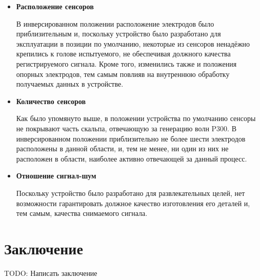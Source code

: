 \documentclass[12pt,fleqn]{article}
\begin{document}
	\begin{itemize}
	\item
	\par {\bf Расположение сенсоров}
	\par В инверсированном положении расположение электродов было приблизительным и, поскольку устройство было разработано для эксплуатации в позиции по умолчанию, некоторые из сенсоров ненадёжно крепились к голове испытуемого, не обеспечивая должного качества регистрируемого сигнала. Кроме того, изменились также и положения опорных электродов, тем самым повлияв на внутреннюю обработку получаемых данных в устройстве.
	\item
	\par {\bf Количество сенсоров}
	\par Как было упомянуто выше, в положении устройства по умолчанию сенсоры не покрывают часть скальпа, отвечающую за генерацию волн P300. В инверсированном положении приблизительно не более шести электродов расположены в данной области, и, тем не менее, ни один из них не расположен в области, наиболее активно отвечающей за данный процесс.
	\item
	\par {\bf Отношение сигнал-шум}
	\par Поскольку устройство было разработано для развлекательных целей, нет возможности гарантировать должное качество изготовления его деталей и, тем самым, качества снимаемого сигнала.
	\end{itemize}

\newpage
\section{Заключение}
TODO: Написать заключение
    
\end{document}
